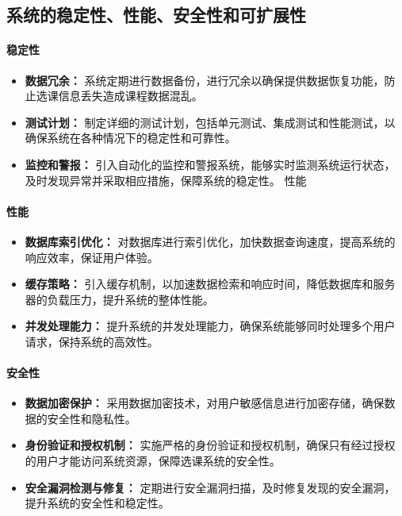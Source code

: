 \documentclass{article}
\begin{document}
\subsection{系统的稳定性、性能、安全性和可扩展性}
\paragraph{稳定性}
\begin{itemize}
	\item \textbf{数据冗余：}  系统定期进行数据备份，进行冗余以确保提供数据恢复功能，防止选课信息丢失造成课程数据混乱。
	\item \textbf{测试计划：} 制定详细的测试计划，包括单元测试、集成测试和性能测试，以确保系统在各种情况下的稳定性和可靠性。
	\item \textbf{监控和警报：} 引入自动化的监控和警报系统，能够实时监测系统运行状态，及时发现异常并采取相应措施，保障系统的稳定性。
	性能
\end{itemize}

\paragraph{性能}
\begin{itemize}
	\item \textbf{数据库索引优化：}  对数据库进行索引优化，加快数据查询速度，提高系统的响应效率，保证用户体验。
	\item \textbf{缓存策略：} 引入缓存机制，以加速数据检索和响应时间，降低数据库和服务器的负载压力，提升系统的整体性能。
	\item \textbf{并发处理能力：} 提升系统的并发处理能力，确保系统能够同时处理多个用户请求，保持系统的高效性。
\end{itemize}

\paragraph{安全性}
\begin{itemize}
	\item \textbf{数据加密保护：}  采用数据加密技术，对用户敏感信息进行加密存储，确保数据的安全性和隐私性。
	\item \textbf{身份验证和授权机制：} 实施严格的身份验证和授权机制，确保只有经过授权的用户才能访问系统资源，保障选课系统的安全性。
	\item \textbf{安全漏洞检测与修复：} 定期进行安全漏洞扫描，及时修复发现的安全漏洞，提升系统的安全性和稳定性。
\end{itemize}
\end{document}

